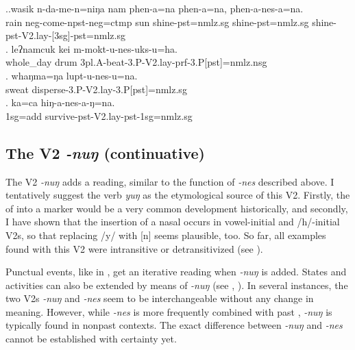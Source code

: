  \ex.\ag.wasik n-da-me-n=niŋa nam phen-a=na phen-a=na, phen-a-nes-a=na.\\
 rain  {\sc neg-}come{\sc -npst-neg=ctmp} sun shine{\sc [3sg]-pst=nmlz.sg} shine{\sc [3sg]-pst=nmlz.sg} shine{\sc -pst-V2.lay-[3sg]-pst=nmlz.sg}\\
 \bg. leʔnamcuk kei m-mokt-u-nes-uks-u=ha.\\
 whole\_day drum {\sc 3pl.A-}beat{\sc -3.P-V2.lay-prf-3.P[pst]=nmlz.nsg}\\
\bg. whaŋma=ŋa lupt-u-nes-u=na.\\
sweat disperse{\sc -3.P-V2.lay-3.P[pst]=nmlz.sg}\\
 \bg. ka=ca hiŋ-a-nes-a-ŋ=na.\\
 {\sc 1sg=add} survive{\sc -pst-V2.lay-pst-1sg=nmlz.sg}\\


\subsection{The V2 \emph{-nuŋ}  (continuative)}\label{V2-nung}%
 
The V2 \emph{-nuŋ}  adds a  reading, similar to the function of \emph{-nes} described above. I tentatively suggest the verb \emph{yuŋ}  as the etymological source of this V2. Firstly, the  of  into a  marker would be a very common development historically, and secondly, I have shown that the insertion of a nasal occurs in vowel-initial and /h/-initial V2s, so that replacing /y/ with [n] seems plausible, too. So far, all examples found with this V2 were intransitive or detransitivized (see \Next).

Punctual events, like in \Next[a], get an iterative reading when \emph{-nuŋ} is added. States and activities can also be extended by means of \emph{-nuŋ} (see \Next[b], \Next[c]). In several instances, the two V2s \emph{-nuŋ} and \emph{-nes} seem to be interchangeable without any change in meaning. However, while \emph{-nes} is more frequently combined with past , \emph{-nuŋ} is typically found in  nonpast contexts. The exact difference between \emph{-nuŋ} and \emph{-nes} cannot be established with certainty yet.

